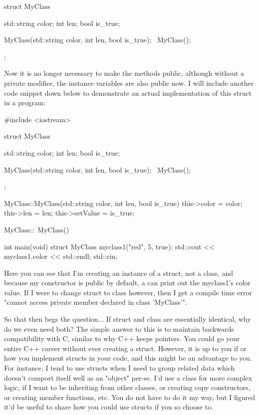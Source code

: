 \documentclass{article}
\begin{document}
\begin{cpplst}

struct MyClass
{
    std::string color;
    int len;
    bool is_true;

    MyClass(std::string color, int len, bool is_true);
    ~MyClass();
};

\end{cpplst}

Now it is no longer necessary to make the methods public, although without a private modifier, the instance
variables are also public now. I will include another code snippet down below to demonstrate an actual
implementation of this struct in a program:

\begin{cpplst}

#include <iostream>

struct MyClass
{
    std::string color;
    int len;
    bool is_true;

    MyClass(std::string color, int len, bool is_true);
    ~MyClass();
};

MyClass::MyClass(std::string color, int len, bool is_true)
{
    this->color = color;
    this->len = len;
    this->setValue = is_true;
}

MyClass::~MyClass()
{}

int main(void)
{
    struct MyClass myclass1("red", 5, true);
    std::cout << myclass1.color << std::endl;
    std::cin;
}

\end{cpplst}

Here you can see that I'm creating an instance of a struct, not a class, and because my constructor is public
by default, a can print out the myclass1's color value. If I were to change struct to class however, then I
get a compile time error "cannot access private member declared in class 'MyClass'".

So that then begs the question... If struct and class are essentially identical, why do we even need both? The
simple answer to this is to maintain backwards compatibility with C, similar to why C++ keeps pointers. You
could go your entire C++ career without ever creating a struct. However, it is up to you if or how you
implement structs in your code, and this might be an advantage to you. For instance, I tend to use structs
when I need to group related data which doesn't comport itself well as an "object" per-se. I'd use a class for
more complex logic, if I want to be inheriting from other classes, or creating copy constructors, or creating
member functions, etc. You do not have to do it my way, but I figured it'd be useful to share how you could
use structs if you so choose to.
\end{document}
